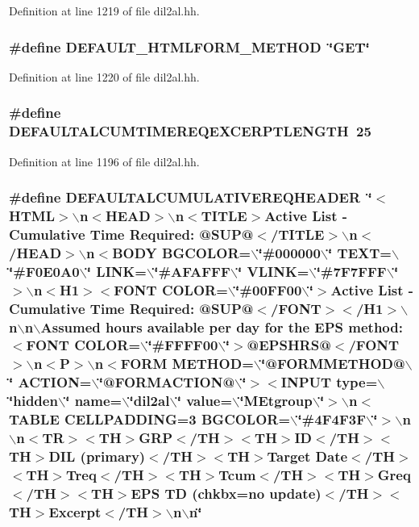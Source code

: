Definition at line 1219 of file dil2al.hh.
\subsubsection{\setlength{\rightskip}{0pt plus 5cm}\#define DEFAULT\_\-HTMLFORM\_\-METHOD\ \char`\"{}GET\char`\"{}}\label{dil2al_8hh_a73}




Definition at line 1220 of file dil2al.hh.
\subsubsection{\setlength{\rightskip}{0pt plus 5cm}\#define DEFAULTALCUMTIMEREQEXCERPTLENGTH\ 25}\label{dil2al_8hh_a49}




Definition at line 1196 of file dil2al.hh.
\subsubsection{\setlength{\rightskip}{0pt plus 5cm}\#define DEFAULTALCUMULATIVEREQHEADER\ \char`\"{}$<$HTML$>$$\backslash$n$<$HEAD$>$$\backslash$n$<$TITLE$>$Active List - Cumulative {\bf Time} Required: @SUP@$<$/TITLE$>$$\backslash$n$<$/HEAD$>$$\backslash$n$<$BODY BGCOLOR=$\backslash$\char`\"{}\#000000$\backslash$\char`\"{} TEXT=$\backslash$\char`\"{}\#F0E0A0$\backslash$\char`\"{} LINK=$\backslash$\char`\"{}\#AFAFFF$\backslash$\char`\"{} VLINK=$\backslash$\char`\"{}\#7F7FFF$\backslash$\char`\"{}$>$$\backslash$n$<$H1$>$$<$FONT COLOR=$\backslash$\char`\"{}\#00FF00$\backslash$\char`\"{}$>$Active List - Cumulative {\bf Time} Required: @SUP@$<$/FONT$>$$<$/H1$>$$\backslash$n$\backslash$n$\backslash$Assumed hours available per day for the EPS method: $<$FONT COLOR=$\backslash$\char`\"{}\#FFFF00$\backslash$\char`\"{}$>$@EPSHRS@$<$/FONT$>$$\backslash$n$<$P$>$$\backslash$n$<$FORM METHOD=$\backslash$\char`\"{}@FORMMETHOD@$\backslash$\char`\"{} ACTION=$\backslash$\char`\"{}@FORMACTION@$\backslash$\char`\"{}$>$$<$INPUT type=$\backslash$\char`\"{}hidden$\backslash$\char`\"{} name=$\backslash$\char`\"{}dil2al$\backslash$\char`\"{} value=$\backslash$\char`\"{}MEtgroup$\backslash$\char`\"{}$>$$\backslash$n$<$TABLE CELLPADDING=3 BGCOLOR=$\backslash$\char`\"{}\#4F4F3F$\backslash$\char`\"{}$>$$\backslash$n$\backslash$n$<$TR$>$$<$TH$>$GRP$<$/TH$>$$<$TH$>$ID$<$/TH$>$$<$TH$>$DIL (primary)$<$/TH$>$$<$TH$>$Target Date$<$/TH$>$$<$TH$>$Treq$<$/TH$>$$<$TH$>$Tcum$<$/TH$>$$<$TH$>$Greq$<$/TH$>$$<$TH$>$EPS TD (chkbx=no update)$<$/TH$>$$<$TH$>$Excerpt$<$/TH$>$$\backslash$n$\backslash$n\char`\"{}}\label{dil2al_8hh_a104}




